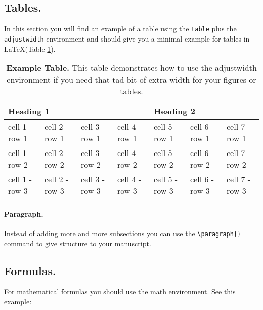 \documentclass[10pt,letterpaper]{article}
\begin{document}
\subsection*{Tables.} 

In this section you will find an example of a table using the \verb!table! plus the \verb!adjustwidth! environment and should give you a minimal example for tables in \LaTeX (Table \ref{tab1}).

\begin{table}[!ht]
\begin{adjustwidth}{-1.5in}{0in} %
\centering
\caption{{\bf Example Table.} This table demonstrates how to use the  adjustwidth environment if you need that tad bit of extra width for your figures or tables.}
\begin{tabular}{|l|l|l|l|l|l|l|}
\hline
\multicolumn{4}{|l|}{\bf Heading 1} & \multicolumn{3}{|l|}{\bf Heading 2}\\ \hline
cell 1 - row 1 & cell 2 - row 1 & cell 3 - row 1 & cell 4 - row 1 & cell 5 - row 1 & cell 6 - row 1 & cell 7 - row 1 \\ \hline
cell 1 - row 2 & cell 2 - row 2 & cell 3 - row 2 & cell 4 - row 2 & cell 5 - row 2 & cell 6 - row 2 & cell 7 - row 2 \\ \hline
cell 1 - row 3 & cell 2 - row 3 & cell 3 - row 3 & cell 4 - row 3 & cell 5 - row 3 & cell 6 - row 3 & cell 7 - row 3 \\ \hline
\end{tabular}
\label{tab1}
\end{adjustwidth}
\end{table}

\paragraph{Paragraph.}
Instead of adding more and more subsections you can use the \verb!\paragraph{}! command to give structure to your manuscript.

\subsection*{Formulas.}
For mathematical formulas you should use the math environment. See this example:
\end{document}
